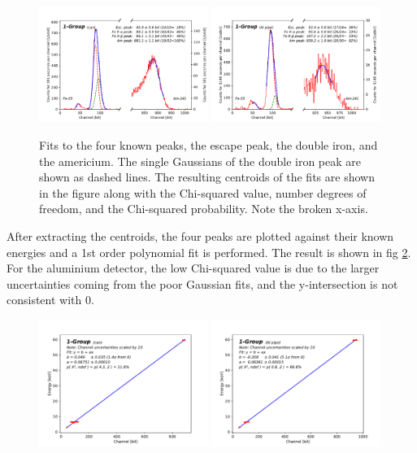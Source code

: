 \begin{figure}[htb]
  \includegraphics[width=0.49\textwidth,page=1]{graphics/channelfits.pdf}
  \includegraphics[width=0.49\textwidth,page=1]{graphics/aluchannelfits.pdf}
  \caption{Fits to the four known peaks, the escape peak, the double iron, and the americium. The single Gaussians of the double iron peak are shown as dashed lines. The resulting centroids of the fits are shown in the figure along with the Chi-squared value, number degrees of freedom, and the Chi-squared probability. Note the broken x-axis.}
  \label{fig:channelfits}
\end{figure}

After extracting the centroids, the four peaks are plotted against their known energies and a 1st order polynomial fit is performed. The result is shown in fig \ref{fig:energychannelcalib}. For the aluminium detector, the low Chi-squared value is due to the larger uncertainties coming from the poor Gaussian fits, and the y-intersection is not consistent with 0.

\begin{figure}[htb]
  \includegraphics[width=0.49\textwidth,page=1]{graphics/energychannelcalib.pdf}
  \includegraphics[width=0.49\textwidth,page=1]{graphics/aluenergychannelcalib.pdf}
  \caption{}
  \label{fig:energychannelcalib}
\end{figure}

